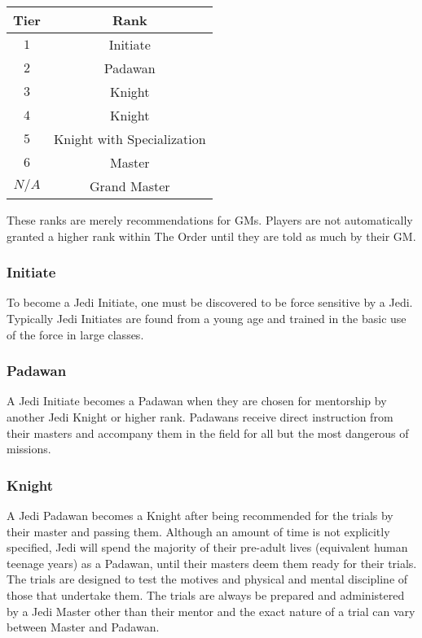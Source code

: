 \documentclass[a4paper,10pt,final,twocolumn,oneside]{book}
\begin{document}
\begin{center}
\begin{tabular}{ |c|c| }
\hline
\textbf{Tier} & \textbf{Rank} \\
\hline \hline
$1$   & Initiate \\
\hline
$2$   & Padawan \\
\hline
$3$   & Knight \\
\hline
$4$   & Knight \\
\hline
$5$   & Knight with Specialization \\
\hline
$6$   & Master \\
\hline
$N/A$ & Grand Master \\
\hline
\end{tabular}
\end{center}

These ranks are merely recommendations for GMs. Players are not automatically granted a higher rank within The Order until they are told as much by their GM.

\subsubsection{Initiate}

To become a Jedi Initiate, one must be discovered to be force sensitive by a Jedi. Typically Jedi Initiates are found from a young age and trained in the basic use of the force in large classes.

\subsubsection{Padawan}

A Jedi Initiate becomes a Padawan when they are chosen for mentorship by another Jedi Knight or higher rank. Padawans receive direct instruction from their masters and accompany them in the field for all but the most dangerous of missions.

\subsubsection{Knight}

A Jedi Padawan becomes a Knight after being recommended for the trials by their master and passing them. Although an amount of time is not explicitly specified, Jedi will spend the majority of their pre-adult lives (equivalent human teenage years) as a Padawan, until their masters deem them ready for their trials. The trials are designed to test the motives and physical and mental discipline of those that undertake them. The trials are always be prepared and administered by a Jedi Master other than their mentor and the exact nature of a trial can vary between Master and Padawan.
\end{document}

